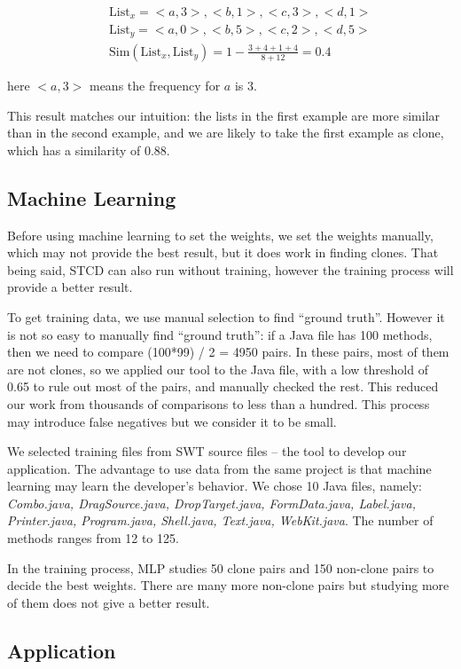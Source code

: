\documentclass[../main.tex]{subfiles}
\begin{document}
\begin{eqnarray}\nonumber
&&\text{List}_x = {<a, 3>, <b, 1>, <c, 3>, <d, 1>}\\ \nonumber
&&\text{List}_y = {<a, 0>, <b, 5>, <c, 2>, <d, 5>} \\ 
&&\text{Sim}(\text{List}_x, \text{List}_y) = 1 - \frac{3 + 4 + 1 + 4}{8 + 12} = 0.4
\end{eqnarray}

here $<a, 3>$ means the frequency for $a$ is 3.

This result matches our intuition: the lists in the first example are more similar than in the second example, and we are likely to take the first example as clone, which has a similarity of 0.88.

\subsection{Machine Learning}

Before using machine learning to set the weights, we set the weights manually, which may not provide the best result, but it does work in finding clones. That being said, STCD can also run without training, however the training process will provide a better result. 

To get training data, we use manual selection to find ``ground truth''. However it is not so easy to manually find ``ground truth'': if a Java file has 100 methods, then we need to compare (100*99) / 2 = 4950 pairs. In these pairs, most of them are not clones, so we applied our tool to the Java file, with a low threshold of 0.65 to rule out most of the pairs, and manually checked the rest. This reduced our work from thousands of comparisons to less than a hundred. This process may introduce false negatives but we consider it to be small.

We selected training files from SWT source files -- the tool to develop our application. The advantage to use data from the same project is that machine learning may learn the developer's behavior. We chose 10 Java files, namely: \textit{Combo.java, DragSource.java, DropTarget.java, FormData.java, Label.java, Printer.java, Program.java, Shell.java, Text.java, WebKit.java}. The number of methods ranges from 12 to 125.

In the training process, MLP studies 50 clone pairs and 150 non-clone pairs to decide the best weights. There are many more non-clone pairs but studying more of them does not give a better result.

\subsection{Application}
\end{document}
